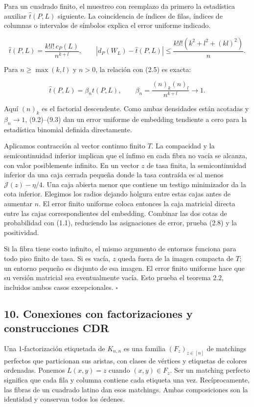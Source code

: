 \documentclass[spanish,11pt,a4paper]{article}
\begin{document}
Para un cuadrado finito, el muestreo con reemplazo da primero la estadística auxiliar \(\widehat t(P,L)\) siguiente. La coincidencia de índices de filas, índices de columnas o intervalos de símbolos explica el error uniforme indicado.

\nopagebreak[4]
\[\widehat t(P,L)=\frac{k!l!\,c_P(L)}{n^{k+l}},\qquad
|d_P(W_L)-\widehat t(P,L)|\le\frac{k!l!(k^2+l^2+(kl)^2)}n.\tag{9.2}\]

Para \(n\ge\max(k,l)\) y \(n>0\), la relación con (2.5) es exacta:

\nopagebreak[4]
\[\widehat t(P,L)=\beta_n t(P,L),\qquad
\beta_n=\frac{(n)_k(n)_l}{n^{k+l}}\longrightarrow1.\tag{9.3}\]

Aquí \((n)_k\) es el factorial descendente. Como ambas densidades están acotadas y \(\beta_n\to1\), (9.2)--(9.3) dan un error uniforme de embedding tendiente a cero para la estadística binomial definida directamente.

Aplicamos contracción al vector continuo finito \(T\). La compacidad y la semicontinuidad inferior implican que el ínfimo en cada fibra no vacía se alcanza, con valor posiblemente infinito. En un vector \(z\) de tasa finita, la semicontinuidad inferior da una caja cerrada pequeña donde la tasa contraída es al menos \(\mathcal J(z)-\eta/4\). Una caja abierta menor que contiene un testigo minimizador da la cota inferior. Elegimos los radios dejando holgura entre estas cajas antes de aumentar \(n\). El error finito uniforme coloca entonces la caja matricial directa entre las cajas correspondientes del embedding. Combinar las dos cotas de probabilidad con (1.1), reduciendo las asignaciones de error, prueba (2.8) y la positividad.

Si la fibra tiene costo infinito, el mismo argumento de entornos funciona para todo piso finito de tasa. Si es vacía, \(z\) queda fuera de la imagen compacta de \(T\); un entorno pequeño es disjunto de esa imagen. El error finito uniforme hace que su versión matricial sea eventualmente vacía. Esto prueba el teorema 2.2, incluidos ambos casos excepcionales. \(\square\)

\subsection{10. Conexiones con factorizaciones y construcciones CDR}\label{conexiones-con-factorizaciones-y-construcciones-cdr}

Una 1-factorización etiquetada de \(K_{n,n}\) es una familia \((F_z)_{z\in[n]}\) de matchings perfectos que particionan sus aristas, con clases de vértices y etiquetas de colores ordenadas. Ponemos \(L(x,y)=z\) cuando \((x,y)\in F_z\). Ser un matching perfecto significa que cada fila y columna contiene cada etiqueta una vez. Recíprocamente, las fibras de un cuadrado latino dan esos matchings. Ambas composiciones son la identidad y conservan todos los órdenes.
\end{document}

